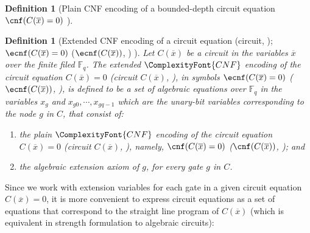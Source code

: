 \documentclass[11pt,letter]{article}
\newtheorem{definition}[theorem]{Definition}
\theoremstyle{remark} %
\newcommand{\CNF}{ %
    {
        \ComplexityFont{CNF}
    }
}
\begin{document}
{\begin{definition}[Plain CNF encoding of a bounded-depth circuit equation $\cnf(C(\overline{x})=0)$ \cite{ST25}]
    \end{definition}

    \begin{definition}[Extended CNF encoding of a circuit equation (circuit, \resp); $\ecnf(C(\overline{x})=0)$ ($\ecnf(C(\overline{x}))$, \resp) \cite{ST25}]
        \label{def: Extended CNF encoding of a circuit equation cnf(C(x)=0)}
         Let $C(\overline{x})$ be a circuit in the variables $\overline{x}$ over the finite filed $\mathbb{F}_q$. The extended $\CNF$ encoding of the circuit equation $C(\overline{x})=0$ (circuit $C(\overline{x})$, \resp), in symbols $\ecnf(C(\overline{x})=0)$ ($\ecnf(C(\overline{x}))$, \resp), is defined to be a set of algebraic equations over $\mathbb{F}_q$ in the variables $x_g$ and $x_{g0},\cdots,x_{gq-1}$ which are the unary-bit variables corresponding to the node $g$ in $C$, that consist of:
         \begin{enumerate}
             \item the plain $\CNF$ encoding of the circuit equation $C(\overline{x})=0$ (circuit $C(\overline{x})$, \resp), namely, $\cnf(C(\overline{x})=0)$ ($\cnf(C(\overline{x}))$, \resp); and
             \item the algebraic extension axiom of $g$, for every gate $g$ in $C$.
         \end{enumerate}
         
    \end{definition}

    Since we work with extension variables for each gate in a given circuit equation $C(\overline{x})=0$, it is more convenient to express circuit equations as a set of equations that correspond to the straight line program of $C(\overline{x})$ (which is equivalent in strength formulation to algebraic circuits):
    
}
\end{document}
